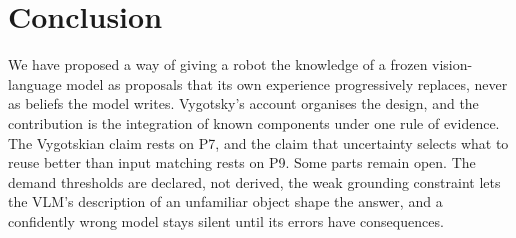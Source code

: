 
\section{Conclusion}
\label{sec:conclusion}

We have proposed a way of giving a robot the knowledge of a frozen vision-language model as proposals that its own
experience progressively replaces, never as beliefs the model writes. Vygotsky's account organises the design, and the
contribution is the integration of known components under one rule of evidence. The Vygotskian claim rests on P7, and the claim that uncertainty selects what to reuse better than input matching rests on P9. Some parts remain open. The demand thresholds are declared, not derived,
the weak grounding constraint lets the VLM's description of an unfamiliar object shape the answer, and a confidently
wrong model stays silent until its errors have consequences.
